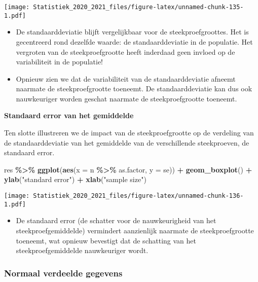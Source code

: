 \documentclass[
  12pt,dutch,coursenotes]{book}
\newenvironment{Shaded}{\begin{snugshade}}{\end{snugshade}}
\newcommand{\DataTypeTok}[1]{\textcolor[rgb]{0.13,0.29,0.53}{#1}}
\newcommand{\KeywordTok}[1]{\textcolor[rgb]{0.13,0.29,0.53}{\textbf{#1}}}
\newcommand{\NormalTok}[1]{#1}
\newcommand{\OperatorTok}[1]{\textcolor[rgb]{0.81,0.36,0.00}{\textbf{#1}}}
\newcommand{\StringTok}[1]{\textcolor[rgb]{0.31,0.60,0.02}{#1}}
\providecommand{\tightlist}{%
  \setlength{\itemsep}{0pt}\setlength{\parskip}{0pt}}
\theoremstyle{definition}
\theoremstyle{definition}
\theoremstyle{definition}
\theoremstyle{remark}
\begin{document}
\texttt{[image: Statistiek\_2020\_2021\_files/figure-latex/unnamed-chunk-135-1.pdf]}

\begin{itemize}
\item
  De standaarddeviatie blijft vergelijkbaar voor de steekproefgroottes.
  Het is gecentreerd rond dezelfde waarde: de standaarddeviatie in de populatie. Het vergroten van de steekproefgrootte heeft inderdaad geen invloed op de variabiliteit in de populatie!
\item
  Opnieuw zien we dat de variabiliteit van de standaarddeviatie afneemt naarmate de steekproefgrootte toeneemt. De standaarddeviatie kan dus ook nauwkeuriger worden geschat naarmate de steekproefgrootte toeneemt.
\end{itemize}

\textbf{Standaard error van het gemiddelde}

Ten slotte illustreren we de impact van de steekproefgrootte op de verdeling van de standaarddeviatie van het gemiddelde van de verschillende steekproeven, de standaard error.

\begin{Shaded}
\begin{Highlighting}[]
\NormalTok{res }\OperatorTok{\%\textgreater{}\%}\StringTok{ }\KeywordTok{ggplot}\NormalTok{(}\KeywordTok{aes}\NormalTok{(}\DataTypeTok{x =}\NormalTok{ n }\OperatorTok{\%\textgreater{}\%}\StringTok{ }\NormalTok{as.factor, }\DataTypeTok{y =}\NormalTok{ se)) }\OperatorTok{+}\StringTok{ }
\StringTok{    }\KeywordTok{geom\_boxplot}\NormalTok{() }\OperatorTok{+}\StringTok{ }\KeywordTok{ylab}\NormalTok{(}\StringTok{"standard error"}\NormalTok{) }\OperatorTok{+}\StringTok{ }\KeywordTok{xlab}\NormalTok{(}\StringTok{"sample size"}\NormalTok{)}
\end{Highlighting}
\end{Shaded}

\texttt{[image: Statistiek\_2020\_2021\_files/figure-latex/unnamed-chunk-136-1.pdf]}

\begin{itemize}
\tightlist
\item
  De standaard error (de schatter voor de nauwkeurigheid van het steekproefgemiddelde) vermindert aanzienlijk naarmate de steekproefgrootte toeneemt, wat opnieuw bevestigt dat de schatting van het steekproefgemiddelde nauwkeuriger wordt.
\end{itemize}

\hypertarget{normaal-verdeelde-gegevens}{%
\subsubsection{Normaal verdeelde gegevens}\label{normaal-verdeelde-gegevens}}
\end{document}
